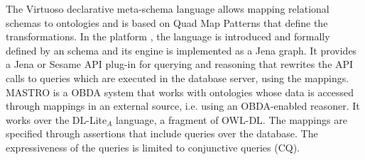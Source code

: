 The Virtuoso \cite{Erling_07} declarative meta-schema language allows mapping relational schemas to \rdf ontologies and is based on Quad Map Patterns that define the transformations. In the \dtworq platform \cite{Bizer_07}, the \dtworq language is introduced and formally defined by an \rdf schema and its engine is implemented as a Jena graph. It provides a Jena or Sesame API plug-in for querying and reasoning that rewrites the API calls to \sql queries which are executed in the database server, using the mappings. MASTRO \cite{Poggi_07} is a OBDA system that works with ontologies whose data is accessed through mappings in an external source, i.e. using an OBDA-enabled reasoner. It works over the DL-Lite${}_A$ language, a fragment of OWL-DL. The mappings are specified through assertions that include \sql queries over the database. The expressiveness of the queries is limited to conjunctive queries (CQ).
\bigskip

